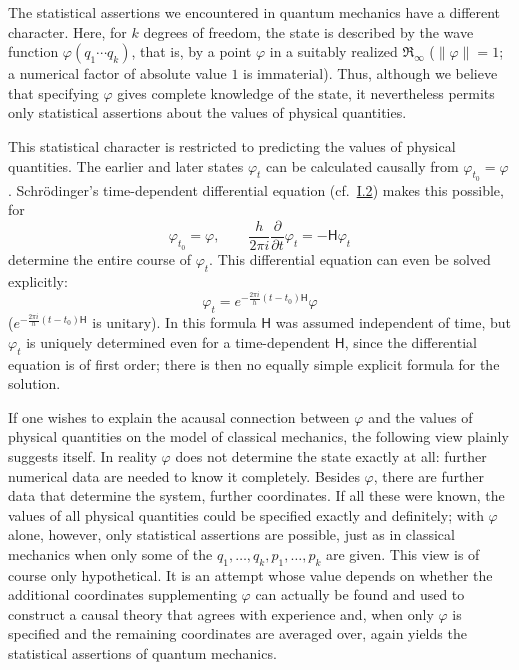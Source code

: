 \documentclass[fontsize=13pt,twoside,openany,headings=normal,parskip=false,bookmarkpackage=false,DIV=calc]{scrbook}
\begin{document}
The statistical assertions we encountered in quantum mechanics have a different character. Here, for $k$ degrees of freedom, the state is described by the wave function $\varphi(q_1\cdots q_k)$, that is, by a point $\varphi$ in a suitably realized $\mathfrak R_\infty$ ($\|\varphi\|=1$; a numerical factor of absolute value $1$ is immaterial). Thus, although we believe that specifying $\varphi$ gives complete knowledge of the state, it nevertheless permits only statistical assertions about the values of physical quantities.

This statistical character is restricted to predicting the values of physical quantities. The earlier and later states $\varphi_t$ can be calculated causally from $\varphi_{t_0}=\varphi$. Schrödinger's time-dependent differential equation (cf.\ \hyperref[sec:I.2]{I.2}) makes this possible, for
\[
\varphi_{t_0}=\varphi,\qquad
\frac h{2\pi i}\frac\partial{\partial t}\varphi_t=-\mathsf H\varphi_t
\]
determine the entire course of $\varphi_t$. This differential equation can even be solved explicitly:
\[
\varphi_t=e^{-\frac{2\pi i}h(t-t_0)\mathsf H}\varphi
\]
($e^{-\frac{2\pi i}h(t-t_0)\mathsf H}$ is unitary). In this formula $\mathsf H$ was assumed independent of time, but $\varphi_t$ is uniquely determined even for a time-dependent $\mathsf H$, since the differential equation is of first order; there is then no equally simple explicit formula for the solution.

If one wishes to explain the acausal connection between $\varphi$ and the values of physical quantities on the model of classical mechanics, the following view plainly suggests itself. In reality $\varphi$ does not determine the state exactly at all: further numerical data are needed to know it completely. Besides $\varphi$, there are further data that determine the system, further coordinates. If all these were known, the values of all physical quantities could be specified exactly and definitely; with $\varphi$ alone, however, only statistical assertions are possible, just as in classical mechanics when only some of the $q_1,\ldots,q_k,p_1,\ldots,p_k$ are given. This view is of course only hypothetical. It is an attempt whose value depends on whether the additional coordinates supplementing $\varphi$ can actually be found and used to construct a causal theory that agrees with experience and, when only
\hypertarget{origpage-109}{}%
$\varphi$ is specified and the remaining coordinates are averaged over, again yields the statistical assertions of quantum mechanics.
\end{document}
